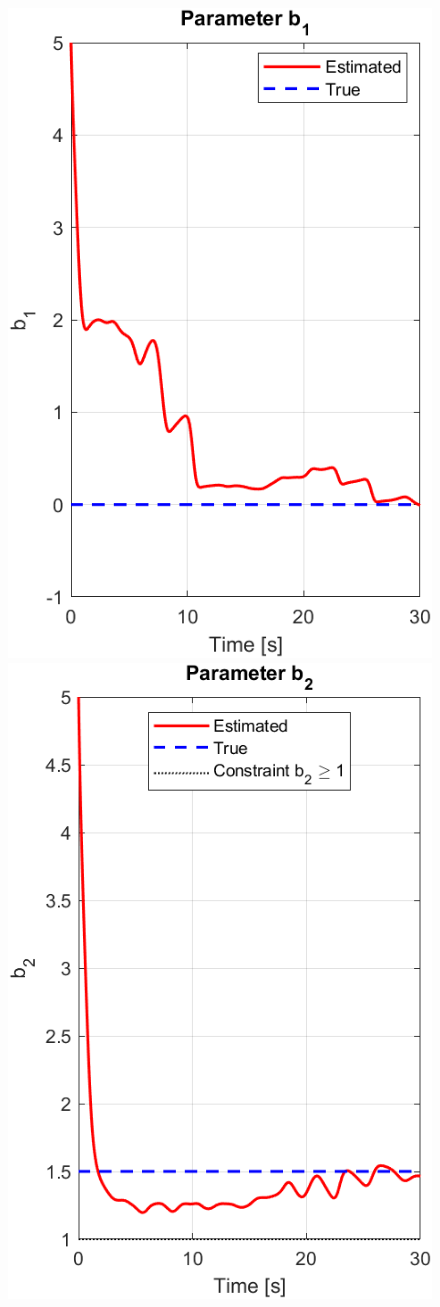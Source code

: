 \documentclass[12pt]{article} %
\numberwithin{equation}{section}  %
\begin{document}
\begin{figure}[ht!]
    \centering
    \begin{minipage}{0.49\textwidth}
        \centering
        \includegraphics[width=0.45\linewidth]{plots/plot7_10_b1_o2.png}
    \end{minipage}
    \hfill
    \begin{minipage}{0.49\textwidth}
        \centering
        \includegraphics[width=0.45\linewidth]{plots/plot7_11_b2_o2.png}
    \end{minipage}
    
    \vspace{1em} %
    

\end{figure}
\end{document}
